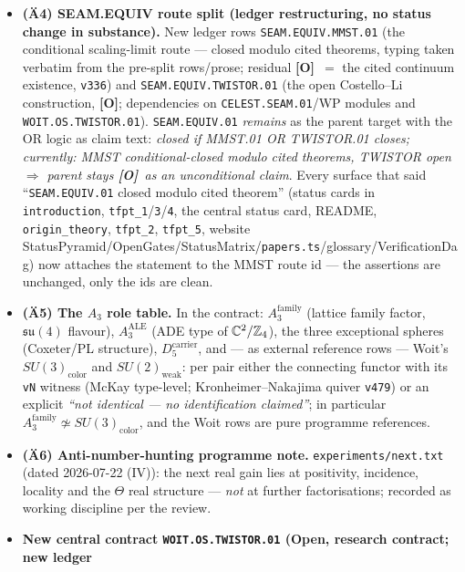 \documentclass[11pt]{article}
\providecommand{\mO}{\textbf{[O]}}\providecommand{\mX}{\textbf{[X]}}
\begin{document}
\begin{itemize}[leftmargin=1.5em]
(arithmetic) or \mO\ (quantisation question); ``$\mathbb{PT}/\Z_4$'' is defined once for the whole
contract (quotient by $\Gamma_{\mathrm{ALE}}$, normalised by $\langle\rho\rangle$) with a
cross-reference sentence in \texttt{tfpt\_3}.
\item \textbf{(\"A4) SEAM.EQUIV route split (ledger restructuring, no status change in substance).}
New ledger rows \texttt{SEAM.EQUIV.MMST.01} (the conditional scaling-limit route --- closed modulo
cited theorems, typing taken verbatim from the pre-split rows/prose; residual \mO\ $=$ the cited
continuum existence, \texttt{v336}) and \texttt{SEAM.EQUIV.TWISTOR.01} (the open Costello--Li
construction, \mO; dependencies on \texttt{CELEST.SEAM.01}/WP modules and
\texttt{WOIT.OS.TWISTOR.01}). \texttt{SEAM.EQUIV.01} \emph{remains} as the parent target with the OR
logic as claim text: \emph{closed if MMST.01 OR TWISTOR.01 closes; currently: MMST
conditional-closed modulo cited theorems, TWISTOR open $\Rightarrow$ parent stays \mO\ as an
unconditional claim}. Every surface that said ``\texttt{SEAM.EQUIV.01} closed modulo cited
theorem'' (status cards in \texttt{introduction}, \texttt{tfpt\_1}/\texttt{3}/\texttt{4}, the
central status card, README, \texttt{origin\_theory}, \texttt{tfpt\_2}, \texttt{tfpt\_5}, website
StatusPyramid/OpenGates/StatusMatrix/\texttt{papers.ts}/glossary/VerificationDag) now attaches the
statement to the MMST route id --- the assertions are unchanged, only the ids are clean.
\item \textbf{(\"A5) The $A_3$ role table.} In the contract: $A_3^{\mathrm{family}}$ (lattice family
factor, $\mathfrak{su}(4)$ flavour), $A_3^{\mathrm{ALE}}$ (ADE type of $\mathbb C^2/\mathbb{Z}_4$), the
three exceptional spheres (Coxeter/PL structure), $D_5^{\mathrm{carrier}}$, and --- as external
reference rows --- Woit's $SU(3)_{\mathrm{color}}$ and $SU(2)_{\mathrm{weak}}$: per pair either the
connecting functor with its \texttt{vN} witness (McKay type-level; Kronheimer--Nakajima quiver
\texttt{v479}) or an explicit \emph{``not identical --- no identification claimed''}; in particular
$A_3^{\mathrm{family}}\not\simeq SU(3)_{\mathrm{color}}$, and the Woit rows are pure programme
references.
\item \textbf{(\"A6) Anti-number-hunting programme note.} \texttt{experiments/next.txt} (dated
2026-07-22 (IV)): the next real gain lies at positivity, incidence, locality and the $\Theta$ real
structure --- \emph{not} at further factorisations; recorded as working discipline per the review.
\item \textbf{New central contract \texttt{WOIT.OS.TWISTOR.01} (Open, research contract; new ledger
}
\end{itemize}
\end{document}
